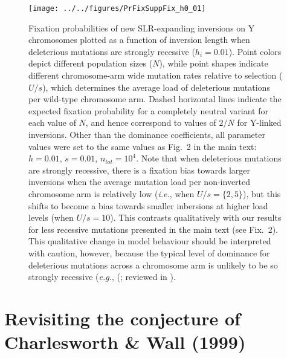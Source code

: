 \documentclass{article}
\begin{document}
\begin{appendices}
 \begin{figure}[htbp]
 \centering
 \texttt{[image: ../../figures/PrFixSuppFix\_h0\_01]}
 \caption{Fixation probabilities of new SLR-expanding inversions on Y chromosomes plotted as a function of inversion length when deleterious mutations are strongly recessive ($h_i = 0.01$). Point colors depict different population sizes ($N$), while point shapes indicate different chromosome-arm wide mutation rates relative to selection ($U/s$), which determines the average load of deleterious mutations per wild-type chromosome arm. Dashed horizontal lines indicate the expected fixation probability for a completely neutral variant for each value of $N$, and hence correspond to values of $2/N$ for Y-linked inversions. Other than the dominance coefficients, all parameter values were set to the same values as Fig.~2 in the main text: $h = 0.01$, $s = 0.01$, $n_{tot} = 10^4$. Note that when deleterious mutations are strongly recessive, there is a fixation bias towards larger inversions when the average mutation load per non-inverted chromosome arm is relatively low ({\itshape i.e.}, when $U/s = \{2, 5\}$), but this shifts to become a bias towards smaller inbersions at higher load levels (when $U/s = 10$). This contrasts qualitatively with our results for less recessive mutations presented in the main text (see Fix.~2). This qualitative change in model behaviour should be interpreted with caution, however, because the typical level of dominance for deleterious mutations across a chromosome arm is unlikely to be so strongly recessive ({\itshape e.g.}, (\citealt{Manna2011, AgrawalWhitlock2012, Huber2018}; reviewed in \citealt{Billiard-etal-2021}). }
 \label{fig:PrFix_strongRecessive}
 \end{figure}



\newpage
 \section{Revisiting the conjecture of Charlesworth \& Wall (1999)} \label{CW1999-App}
 \renewcommand{\theequation}{D\arabic{equation}}
 \setcounter{equation}{0}
 \renewcommand{\thefigure}{D\arabic{figure}}
 \setcounter{figure}{0}


\end{appendices}
\end{document}
